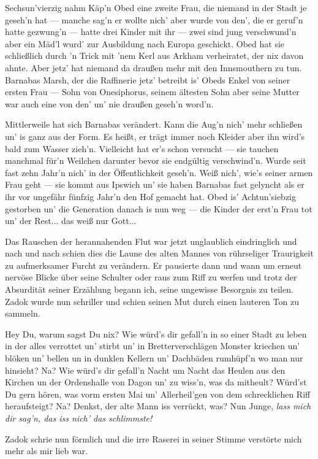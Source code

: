 Sechsun'vierzig nahm Käp'n Obed eine zweite Frau, die niemand in der Stadt je geseh'n hat --- manche sag'n er wollte nich' aber wurde von den', die er geruf'n hatte gezwung'n --- hatte drei Kinder mit ihr --- zwei sind jung verschwund'n aber ein Mäd'l wurd' zur Ausbildung nach Europa geschickt. Obed hat sie schließlich durch 'n Trick mit 'nem Kerl aus Arkham verheiratet, der nix davon ahnte. Aber jetz' hat niemand da draußen mehr mit den Innsmouthern zu tun. Barnabas Marsh, der die Raffinerie jetz' betreibt is' Obeds Enkel von seiner ersten Frau --- Sohn von Onesiphorus, seinem ältesten Sohn aber seine Mutter war auch eine von den' un' nie draußen geseh'n word'n.

Mittlerweile hat sich Barnabas verändert. Kann die Aug'n nich' mehr schließen un' is ganz aus der Form. Es heißt, er trägt immer noch Kleider aber ihn wird's bald zum Wasser zieh'n. Vielleicht hat er's schon versucht --- sie tauchen manchmal für'n Weilchen darunter bevor sie endgültig verschwind'n. Wurde seit fast zehn Jahr'n nich' in der Öffentlichkeit geseh'n. Weiß nich', wie's seiner armen Frau geht --- sie kommt aus Ipswich un' sie haben Barnabas fast gelyncht als er ihr vor ungefähr fünfzig Jahr'n den Hof gemacht hat. Obed is' Achtun'siebzig gestorben un' die Generation danach is nun weg --- die Kinder der erst'n Frau tot un' der Rest... das weiß nur Gott...
\grqq

 Das Rauschen der herannahenden Flut war jetzt unglaublich eindringlich und nach und nach schien dies die Laune des alten Mannes von rührseliger Traurigkeit zu aufmerksamer Furcht zu verändern. Er pausierte dann und wann um erneut nervöse Blicke über seine Schulter oder raus zum Riff zu werfen und trotz der Absurdität seiner Erzählung begann ich, seine ungewisse Besorgnis zu teilen. Zadok wurde nun schriller und schien seinen Mut durch einen lauteren Ton zu sammeln.

\glqq Hey Du, warum sagst Du nix? Wie würd's dir gefall'n in so einer Stadt zu leben in der alles verrottet un' stirbt un' in Bretterverschlägen Monster kriechen un' blöken un' bellen un in dunklen Kellern un' Dachbäden rumhüpf'n wo man nur hinsieht? Na? Wie würd's dir gefall'n Nacht um Nacht das Heulen aus den Kirchen un der Ordenshalle von Dagon un' zu wiss'n, was da mitheult? Würd'st Du gern hören, was vorm ersten Mai un' Allerheil'gen von dem schrecklichen Riff heraufsteigt? Na? Denkst, der alte Mann iss verrückt, was? Nun Junge, \textit{lass mich dir sag'n, das iss nich' das schlimmste!}\grqq

Zadok schrie nun förmlich und die irre Raserei in seiner Stimme verstörte mich mehr als mir lieb war.

